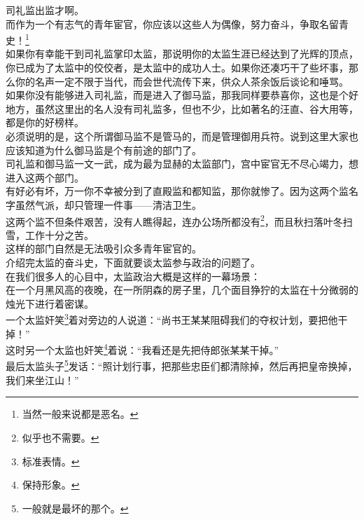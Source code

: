 \begin{multicols}{\theparacolNo}
司礼监出监才啊。\\

而作为一个有志气的青年宦官，你应该以这些人为偶像，努力奋斗，争取名留青史！\footnote{当然一般来说都是恶名。}\\

如果你有幸能干到司礼监掌印太监，那说明你的太监生涯已经达到了光辉的顶点，你已成为了太监中的佼佼者，是太监中的成功人士。如果你还凑巧干了些坏事，那么你的名声一定不限于当代，而会世代流传下来，供众人茶余饭后谈论和唾骂。\\

如果你没有能够进入司礼监，而是进入了御马监，那我同样要恭喜你，这也是个好地方，虽然这里出的名人没有司礼监多，但也不少，比如著名的汪直、谷大用等，都是你的好榜样。\\

必须说明的是，这个所谓御马监不是管马的，而是管理御用兵符。说到这里大家也应该知道为什么御马监是个有前途的部门了。\\

司礼监和御马监一文一武，成为最为显赫的太监部门，宫中宦官无不尽心竭力，想进入这两个部门。\\

有好必有坏，万一你不幸被分到了直殿监和都知监，那你就惨了。因为这两个监名字虽然气派，却只管理一件事——清洁卫生。\\

这两个监不但条件艰苦，没有人瞧得起，连办公场所都没有\footnote{似乎也不需要。}，而且秋扫落叶冬扫雪，工作十分之苦。\\

这样的部门自然是无法吸引众多青年宦官的。\\

介绍完太监的奋斗史，下面就要谈太监参与政治的问题了。\\

在我们很多人的心目中，太监政治大概是这样的一幕场景：\\

在一个月黑风高的夜晚，在一所阴森的房子里，几个面目狰狞的太监在十分微弱的烛光下进行着密谋。\\

一个太监奸笑\footnote{标准表情。}着对旁边的人说道：“尚书王某某阻碍我们的夺权计划，要把他干掉！”\\

这时另一个太监也奸笑\footnote{保持形象。}着说：“我看还是先把侍郎张某某干掉。”\\

最后太监头子\footnote{一般就是最坏的那个。}发话：“照计划行事，把那些忠臣们都清除掉，然后再把皇帝换掉，我们来坐江山！”\\


\end{multicols}
